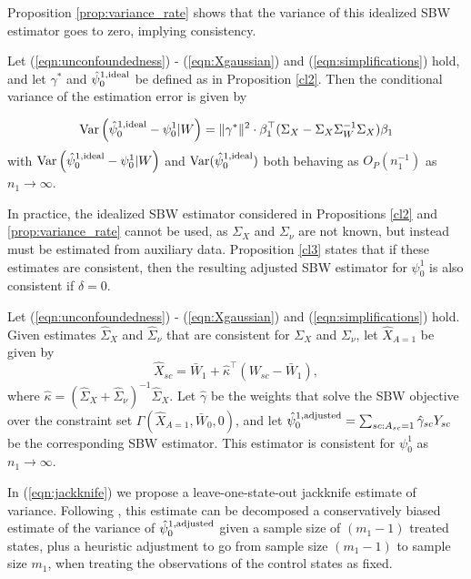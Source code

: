 Proposition \ref{prop:variance_rate} shows that the variance of this idealized SBW estimator goes to zero, implying consistency. 
\begin{proposition}\label{prop:variance_rate}
Let (\ref{eqn:unconfoundedness}) - (\ref{eqn:Xgaussian}) and (\ref{eqn:simplifications}) hold, and let $\gamma^*$ and $\hat{\psi}_0^{1, \textup{ideal}}$ be defined as in Proposition \ref{cl2}. Then the conditional variance of the estimation error is given by

\begin{align*}
\operatorname{Var}\left( \hat{\psi}_0^{1, \textup{ideal}} - \psi_0^1| W\right)  = \|\gamma^*\|^2 \cdot \beta_1^\top (\Sigma_{X} - \Sigma_{X}\Sigma_{W}^{-1}\Sigma_{X})\beta_1
\end{align*}
with $\operatorname{Var}\left( \hat{\psi}_0^{1, \textup{ideal}} - \psi_0^1| W\right)$ and $\operatorname{Var}(\hat{\psi}_0^{1,\textup{ideal}})$ both behaving as $O_P(n_1^{-1})$ as $n_1 \rightarrow \infty$.
\end{proposition}

In practice, the idealized SBW estimator considered in Propositions \ref{cl2} and \ref{prop:variance_rate} cannot be used, as $\Sigma_X$ and $\Sigma_{\nu}$ are not known, but instead must be estimated from auxiliary data. Proposition \ref{cl3} states that if these estimates are consistent, then the resulting adjusted SBW estimator for $\psi_0^1$ is also consistent if $\delta = 0$.

\begin{proposition}\label{cl3}
Let (\ref{eqn:unconfoundedness}) - (\ref{eqn:Xgaussian}) and (\ref{eqn:simplifications}) hold. Given estimates $\hat{\Sigma}_X$ and $\hat{\Sigma}_\nu$ that are consistent for $\Sigma_X$ and $\Sigma_\nu$, let $\hat{X}_{A=1}$ be given by 
\[ \hat{X}_{sc} = \bar{W}_1 + \hat{\kappa}^\top(W_{sc} - \bar{W}_1), \]
where $\hat{\kappa} = (\hat{\Sigma}_X + \hat{\Sigma}_{\nu})^{-1} \hat{\Sigma}_X$. Let $\hat{\gamma}$ be the weights that solve the SBW objective over the constraint set $\Gamma(\hat{X}_{A=1}, \bar{W}_0, 0)$, and let $\hat{\psi}^{1, \textup{adjusted}}_0 = \sum_{sc: A_{sc} = 1} \hat{\gamma}_{sc} Y_{sc}$ be the corresponding SBW estimator. This estimator is consistent for $\psi_0^1$ as $n_1 \to \infty$.
\end{proposition}

In (\ref{eqn:jackknife}) we propose a leave-one-state-out jackknife estimate of variance. Following \citet{efron1981jackknife}, this estimate can be decomposed a conservatively biased estimate of the variance of $\hat{\psi}_0^{1, \textup{adjusted}}$ given a sample size of $(m_1-1)$ treated states, plus a heuristic adjustment to go from sample size $(m_1-1)$ to sample size $m_1$, when treating the observations of the control states as fixed.

